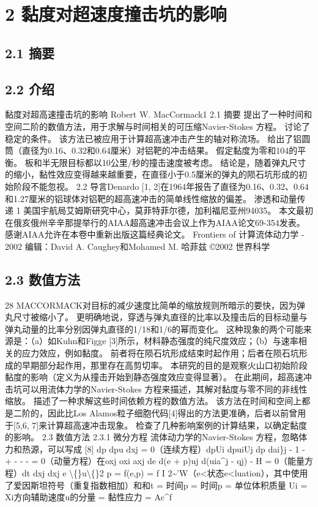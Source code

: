\documentclass[UTF8,11pt,a4paper,openany,fontset=fandol]{ctexbook}
\begin{document}
\clearpage
\chapter{2 黏度对超速度撞击坑的影响}
\section{2.1 摘要}
\section{2.2 介绍}
黏度对超高速撞击坑的影响 Robert W. MacCormack1 2.1 摘要 提出了一种时间和空间二阶的数值方法，用于求解与时间相关的可压缩Navier-Stokes 方程。 讨论了稳定的条件。 该方法已被应用于计算超高速冲击产生的轴对称流场。 给出了铝圆筒（直径为0.16、0.32和0.64厘米）对铝靶的冲击结果。 假定黏度为零和104的平衡。 板和半无限目标都以10公里/秒的撞击速度被考虑。 结论是，随着弹丸尺寸的缩小，黏性效应变得越来越重要，在直径小于0.5厘米的弹丸的陨石坑形成的初始阶段不能忽视。 2.2 导言Denardo [1, 2]在1964年报告了直径为0.16、0.32、0.64和1.27厘米的铝球体对铝靶的超高速冲击的简单线性缩放的偏差。 渗透和动量传递 1 美国宇航局艾姆斯研究中心，莫菲特菲尔德，加利福尼亚州94035。 本文最初在俄亥俄州辛辛那提举行的AIAA超高速冲击会议上作为AIAA论文69-354发表。 感谢AIAA允许在本卷中重新出版这篇经典论文。 Frontiers of 计算流体动力学 - 2002 编辑：David A. Caughey和Mohamed M. 哈菲兹 ©2002 世界科学

\section{2.3 数值方法}
28 MACCORMACK对目标的减少速度比简单的缩放规则所暗示的要快，因为弹丸尺寸被缩小了。 更明确地说，穿透与弹丸直径的比率以及撞击后的目标动量与弹丸动量的比率分别因弹丸直径的1/18和1/6的幂而变化。 这种现象的两个可能来源是：（a）如Kuhn和Figge [3]所示，材料静态强度的纯尺度效应；（b）与速率相关的应力效应，例如黏度。 前者将在陨石坑形成结束时起作用；后者在陨石坑形成的早期部分起作用，那里存在高剪切率。 本研究的目的是观察火山口初始阶段黏度的影响（定义为从撞击开始到静态强度效应变得显著）。 在此期间，超高速冲击坑可以用流体力学的Navier-Stokes 方程来描述，其解对黏度与零不同的非线性缩放。 描述了一种求解这些时间依赖方程的数值方法。 该方法在时间和空间上都是二阶的，因此比Los Alamos粒子细胞代码[4]得出的方法更准确，后者以前曾用于[5,6, 7]来计算超高速冲击现象。 检查了几种影响案例的计算结果，以确定黏度的影响。 2.3 数值方法 2.3.1 微分方程 流体动力学的Navier-Stokes 方程，忽略体力和热源，可以写成 [8] dp dpu dxj = 0（连续方程）dpUi dpuiUj dp dai\}j - 1 - + - - - = 0（动量方程）在oxj oxi axj de d(e + p)uj d(uia\textasciicircum{}j - qj) - H = 0（能量方程）dt dxj dxj e \textbackslash\{\}u\textbackslash\{\}2 p = f(e,p) = f I 2\textasciitilde{}'W（e<状态e<luation），其中使用了爱因斯坦符号（重复指数相加）和和t = 时间p = 时间p = 单位体积质量 Ui = Xi方向辅助速度u的分量 = 黏性应力 = Ac\textasciicircum{}f
\end{document}
